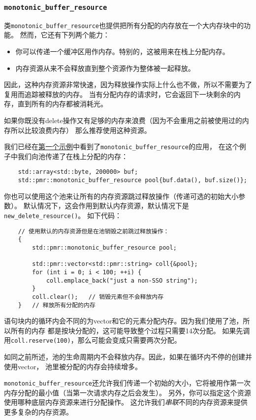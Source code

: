 \subsubsection{\texttt{monotonic\_buffer\_resource}}
类\texttt{monotonic\_buffer\_resource}也提供把所有分配的内存放在一个大内存块中的功能。
然而，它还有下列两个能力：
\begin{itemize}
    \item 你可以传递一个缓冲区用作内存。特别的，这被用来在栈上分配内存。
    \item 内存资源从来不会释放直到整个资源作为整体被一起释放。
\end{itemize}
因此，这种内存资源非常快速，因为释放操作实际上什么也不做，所以不需要为了复用而追踪被释放的内存。
当有分配内存的请求时，它会返回下一块剩余的内存，直到所有的内存都被消耗光。

如果你既没有delete操作又有足够的内存来浪费（因为不会重用之前被使用过的内存所以比较浪费内存）
那么推荐使用这种资源。

我们已经在\hyperref[ch29.1.1.1]{第一个示例}中看到了\texttt{monotonic\_buffer\_resource}的应用，
在这个例子中我们向池传递了在栈上分配的内存：
\begin{lstlisting}
    std::array<std::byte, 200000> buf;
    std::pmr::monotonic_buffer_resource pool{buf.data(), buf.size()};
\end{lstlisting}
你也可以使用这个池来让所有的内存资源跳过释放操作（传递可选的初始大小参数）。
默认情况下，这会作用到默认内存资源，默认情况下是\texttt{new\_delete\_resource()}。
如下代码：
\begin{lstlisting}
    // 使用默认的内存资源但是在池销毁之前跳过释放操作：
    {
        std::pmr::monotonic_buffer_resource pool;

        std::pmr::vector<std::pmr::string> coll{&pool};
        for (int i = 0; i < 100; ++i) {
            coll.emplace_back("just a non-SSO string");
        }
        coll.clear();   // 销毁元素但不会释放内存
    }   // 释放所有分配的内存
\end{lstlisting}
语句块内的循环内会不同的为vector和它的元素分配内存。因为我们使用了池，所以所有的内存
都是按块分配的，这可能导致整个过程只需要14次分配。
如果先调用\texttt{coll.reserve(100)}，那么可能会变成只需要两次分配。

如同之前所述，池的生命周期内不会释放内存。因此，如果在循环内不停的创建并使用vector，
池里被分配的内存会持续增多。

\texttt{monotonic\_buffer\_resource}还允许我们传递一个初始的大小，它将被用作第一次
内存分配的最小值（当第一次请求内存之后会发生）。
另外，你可以指定这个资源使用哪种底层内存资源来进行分配操作。
这允许我们\emph{串联}不同的内存资源来提供更多复杂的内存资源。

